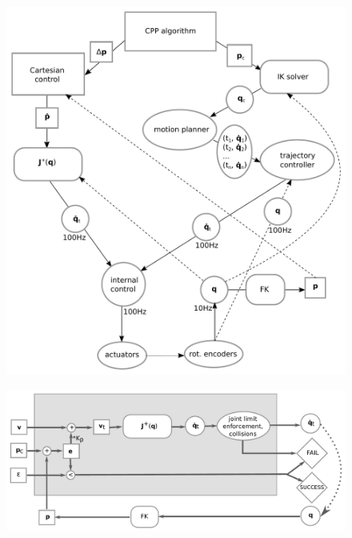 \documentclass{beamer}
\begin{document}
\begin{frame}
  \vspace{-0.5cm}
  \begin{figure}[ht]
    \centering
    \includegraphics[height=\textheight]{control_all.pdf}
  \end{figure}

\end{frame}



\begin{frame}
  \vspace{-0.5cm}
  \begin{figure}[ht]
    \centering
    \includegraphics[width=\textwidth]{control_jacob.pdf}
  \end{figure}

\end{frame}
\end{document}
